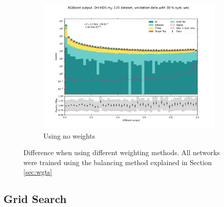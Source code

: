 \documentclass[12pt, a4paper]{book}
\begin{document}
\begin{figure}[!ht]
\begin{subfigure}[b]{0.49\textwidth}
      \includegraphics[width=1\textwidth]{NONE/VAL.pdf}
      \caption{Using no weights}
   \end{subfigure}
   \caption[Difference when using different weighting methods on BDTs]{Difference when using different weighting methods. All networks were trained using the balancing method explained in Section \ref{sec:wgts}}\label{fig:BDT_wgts}
\end{figure}


\clearpage
\subsection{Grid Search}\label{sec:BDTGriddy_res}
\end{document}

